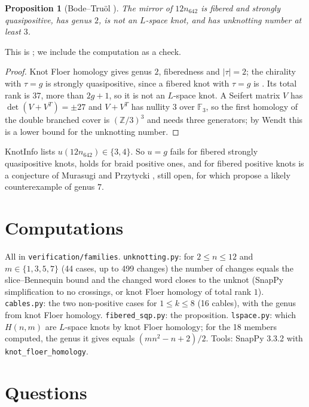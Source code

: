 \documentclass[11pt]{article}
\newtheorem{proposition}{Proposition}
\begin{document}
\begin{proposition}[Bode--Tru\"ol \cite{BT}]
The mirror of $12n_{642}$ is fibered and strongly quasipositive, has genus $2$, is not an $L$-space knot, and has
unknotting number at least $3$.
\end{proposition}

\noindent This is \cite[\S 2.7.2 and Example 6.1]{BT}; we include the computation as a check.

\begin{proof}
Knot Floer homology gives genus $2$, fiberedness and $|\tau| = 2$; the chirality with $\tau = g$ is strongly
quasipositive, since a fibered knot with $\tau = g$ is \cite{Hedden2}. Its total rank is 37, more than $2g+1$,
so it is not an $L$-space knot. A Seifert matrix $V$ has $\det(V+V^T) = \pm 27$ and $V + V^T$ has nullity $3$ over
$\mathbb{F}_3$, so the first homology of the double branched cover is $(\mathbb{Z}/3)^3$ and needs three generators;
by Wendt \cite{Wendt} this is a lower bound for the unknotting number.
\end{proof}

\noindent KnotInfo lists $u(12n_{642}) \in \{3, 4\}$. So $u = g$ fails for fibered strongly quasipositive knots, holds
for braid positive ones, and for fibered positive knots is a conjecture of Murasugi and Przytycki \cite[Problem 1.5(a)]{K3},
still open, for which \cite{KLMMMS} propose a likely counterexample of genus $7$.

\section{Computations}

All in \texttt{verification/families}. \texttt{unknotting.py}: for $2 \le n \le 12$ and $m \in \{1, 3, 5, 7\}$
(44 cases, up to 499 changes) the number of changes equals the slice--Bennequin bound and the changed word
closes to the unknot (SnapPy simplification to no crossings, or knot Floer homology of total rank $1$).
\texttt{cables.py}: the two non-positive cases for $1 \le k \le 8$ (16 cables), with the genus from knot Floer
homology. \texttt{fibered\_sqp.py}: the proposition. \texttt{lspace.py}: which $H(n,m)$ are $L$-space knots by knot Floer
homology; for the 18 members computed, the genus it gives equals $(mn^2-n+2)/2$. Tools: SnapPy 3.3.2 with \texttt{knot\_floer\_homology}.

\section{Questions}
\end{document}
